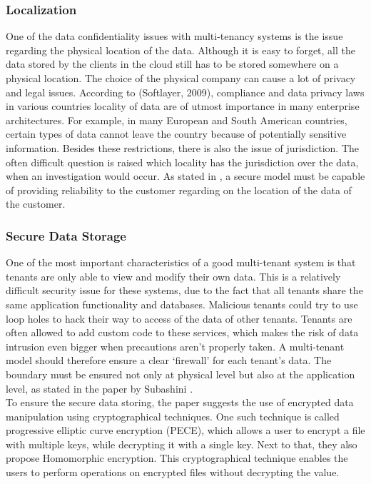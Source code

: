 \subsubsection{Localization}
One of the data confidentiality issues with multi-tenancy systems is the issue regarding the physical location of the data. Although it is easy to forget, all the data stored by the clients in the cloud still has to be stored somewhere on a physical location. The choice of the physical company can cause a lot of privacy and legal issues. According to (Softlayer, 2009), compliance and data privacy laws in various countries locality of data are of utmost importance in many enterprise architectures. For example, in many European and South American countries, certain types of data cannot leave the country because of potentially sensitive information. Besides these restrictions, there is also the issue of jurisdiction. The often difficult question is raised which locality has the jurisdiction over the data, when an investigation would occur. As stated in \cite{Subashini2010Security}, a secure model must be capable of providing reliability to the customer regarding on the location of the data of the customer.

\subsubsection{Secure Data Storage}
One of the most important characteristics of a good multi-tenant system is that tenants are only able to view and modify their own data. This is a relatively difficult security issue for these systems, due to the fact that all tenants share the same application functionality and databases. Malicious tenants could try to use loop holes to hack their way to access of the data of other tenants. Tenants are often allowed to add custom code to these services, which makes the risk of data intrusion even bigger when precautions aren’t properly taken. A multi-tenant model should therefore ensure a clear ‘firewall’ for each tenant’s data. The boundary must be ensured not only at physical level but also at the application level, as stated in the paper by Subashini \cite{Subashini2010Security}. \\
To ensure the secure data storing, the paper \cite{Takahashi2012Security} suggests the use of encrypted data manipulation using cryptographical techniques. One such technique is called progressive elliptic curve encryption (PECE), which allows a user to encrypt a file with multiple keys, while decrypting it with a single key. Next to that, they also propose Homomorphic encryption. This cryptographical technique enables the users to perform operations on encrypted files without decrypting the value.

